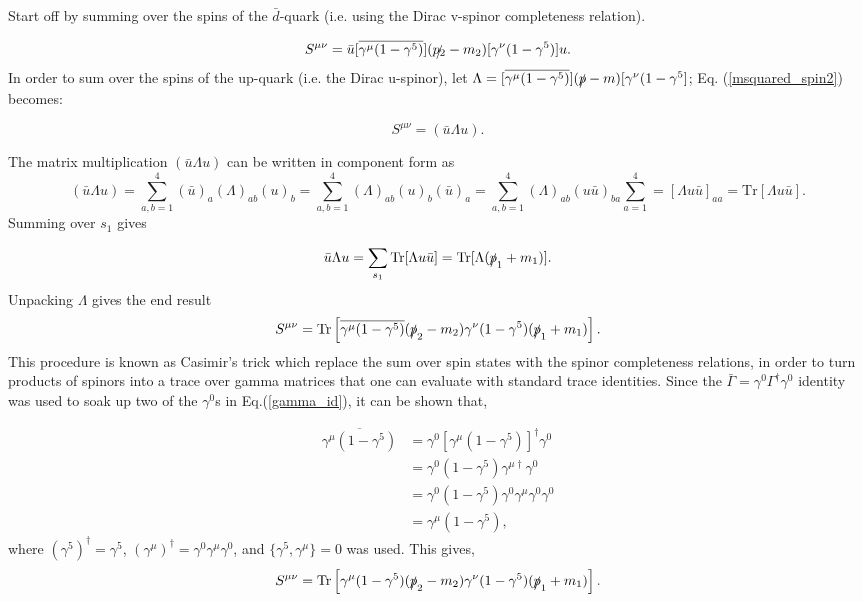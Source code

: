 \documentclass[a4paper,11pt]{article}
\begin{document}
  Start off by summing over the spins of the $\bar{d}$-quark (i.e. using the Dirac v-spinor completeness relation). 
 
\begin{equation}\label{msquared_spin2}
	S^{\mu\nu}= \bar{u} [\overline{\gamma^\mu (1-\gamma^5)}] (\slashed{p_2}-m_2) [\gamma^\nu (1-\gamma^5)] u.
\end{equation}  
In order to sum over the spins of the up-quark (i.e. the Dirac u-spinor), let $\Lambda=   [\overline{\gamma^\mu (1-\gamma^5)}] (\slashed{p}-m) [\gamma^\nu (1-\gamma^5]$; Eq. (\ref{msquared_spin2}) becomes:

\begin{equation}\label{msquared_spin2_2}
	S^{\mu\nu}= (\bar{u}\Lambda u).
\end{equation}  

The matrix multiplication $(\bar{u}\Lambda u)$ can be written in component form as 
$$(\bar{u}\Lambda u)= \sum_{a,b=1}^4 (\bar{u})_a (\Lambda)_{ab} (u)_b = \sum_{a,b=1}^4 (\Lambda)_{ab} (u)_b(\bar{u})_a = \sum_{a,b=1}^4 (\Lambda)_{ab} (u\bar{u})_{ba} \sum_{a= 1}^4 = [\Lambda u\bar{u}]_{aa} = \text{Tr}[\Lambda u \bar{u}].$$ Summing over $s_1$ gives 

$$ \bar{u}\Lambda u = \sum_{s_1} \text{Tr}[\Lambda u \bar{u}] = \text{Tr}[\Lambda(\slashed{p}_1+m_1)].$$ Unpacking $\Lambda$ gives the end result $$S^{\mu\nu}= \text{Tr}\left[\overline{\gamma^\mu (1-\gamma^5)} (\slashed{p}_2-m_2) \gamma^\nu (1-\gamma^5)(\slashed{p}_1+m_1)\right].$$ This procedure is known as Casimir's trick which replace the sum over spin states with the spinor completeness relations, in order to turn products of spinors into a trace over gamma matrices that one can evaluate with standard trace identities. Since the $\bar{\Gamma}= \gamma^0 \Gamma^\dagger \gamma^0$ identity was used to soak up two of the $\gamma^0$s in Eq.(\ref{gamma_id}), it can be shown that,

\begin{equation}\label{overline-id}
	\begin{aligned}
		\overline{\gamma^\mu (1-\gamma^5)} &= \gamma^0 [\gamma^\mu(1-\gamma^5)]^\dagger \gamma^0 \\
		&= \gamma^0(1-\gamma^5)\gamma^{\mu \dagger}\gamma^0 \\
		&= \gamma^0(1-\gamma^5)\gamma^0 \gamma^\mu \gamma^0 \gamma^0 \\
		&= \gamma^\mu (1-\gamma^5),
	\end{aligned}
\end{equation}
where $(\gamma^5)^\dagger = \gamma^5$, $(\gamma^\mu)^\dagger = \gamma^0  \gamma^\mu \gamma^0$, and $\{\gamma^5, \gamma^\mu\}= 0$ was used. This gives,
\begin{equation}\label{M_s}
	S^{\mu\nu}= \text{Tr}\left[\gamma^\mu (1-\gamma^5)(\slashed{p}_2-m_2)\gamma^\nu (1-\gamma^5)(   \slashed{p}_1+m_1) \right].
\end{equation}
\end{document}
